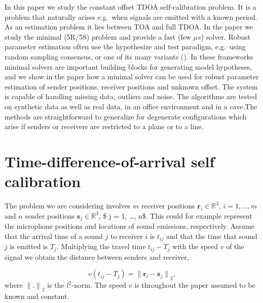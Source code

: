 \documentclass[
]{book}
\def\ltwo{{$l^2$}}
\providecommand{\norm}[1]{\lVert#1\rVert}
\begin{document}
In this paper we study the constant offset TDOA self-calibration problem. It is a problem that naturally arises e.g.~when signals are emitted with a known period. As an estimation problem it lies between TOA and full TDOA. In the paper we study the minimal (5R/5S) problem and provide a fast (few \(\mu s\)) solver.
Robust parameter estimation often use the hypothesize and test paradigm, e.g.~using random sampling consensus, \cite{fischler-bolles-ca-81} or one of its many variants (\cite{chum2003locally,raguram2013usac,korman2018latent}). In these frameworks minimal solvers are important building blocks for generating model hypotheses, and we show in the paper how a minimal solver can be used for robust parameter estimation of sender positions, receiver positions and unknown offset. The system is capable of handling missing data, outliers and noise. The algorithms are tested on synthetic data as well as real data, in an office environment and in a cave.The methods are straightforward to generalize for degenerate configurations which arise if senders or receivers are restricted to a plane or to a line.

\hypertarget{time-difference-of-arrival-self-calibration}{%
\section{Time-difference-of-arrival self calibration}\label{time-difference-of-arrival-self-calibration}}

The problem we are considering involves \(m\) receiver positions \(\mathbf{r}_i \in \mathbb R^3\), \(i = 1, \dots, m\) and \(n\) sender positions \(\mathbf{s}_j \in \mathbb R^3\), \$ j = 1, \dots, n\$. This could for example represent the microphone positions and locations of sound emissions, respectively. Assume that the arrival time of a sound \(j\) to receiver \(i\) is \(t_{ij}\) and that the time that sound \(j\) is emitted is \(T_j\).
Multiplying the travel time \(t_{ij} - T_j\) with the speed \(v\) of the signal we obtain the distance between senders and receiver,

\begin{equation}
v (t_{ij}-T_j)   = {\norm{\mathbf{r}_i - \mathbf{s}_j}}_2 ,
\label{eq:tdoa}
\end{equation}
where \({\norm{.}}_2\) is the \ltwo-norm. The speed \(v\) is throughout the paper assumed to be known and constant.
\end{document}
